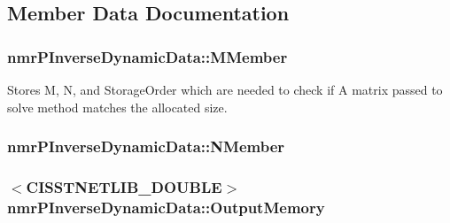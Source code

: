\subsection{Member Data Documentation}
\hypertarget{classnmr_p_inverse_dynamic_data_a747c7b9fb8208d7a1a1b780e5fb0fb55}{
\subsubsection[{M\-Member}]{ nmr\-P\-Inverse\-Dynamic\-Data\-::\-M\-Member\hspace{0.3cm}{\ttfamily [protected]}}}\label{classnmr_p_inverse_dynamic_data_a747c7b9fb8208d7a1a1b780e5fb0fb55}
Stores M, N, and Storage\-Order which are needed to check if A matrix passed to solve method matches the allocated size. \hypertarget{classnmr_p_inverse_dynamic_data_a1ba9d083e553858b17f7ec109261223e}{
\subsubsection[{N\-Member}]{ nmr\-P\-Inverse\-Dynamic\-Data\-::\-N\-Member\hspace{0.3cm}{\ttfamily [protected]}}}\label{classnmr_p_inverse_dynamic_data_a1ba9d083e553858b17f7ec109261223e}
\hypertarget{classnmr_p_inverse_dynamic_data_ac1c4149267a493ae2077a77ebe33224a}{
\subsubsection[{Output\-Memory}]{$<$C\-I\-S\-S\-T\-N\-E\-T\-L\-I\-B\-\_\-\-D\-O\-U\-B\-L\-E$>$ nmr\-P\-Inverse\-Dynamic\-Data\-::\-Output\-Memory\hspace{0.3cm}{\ttfamily [protected]}}}\label{classnmr_p_inverse_dynamic_data_ac1c4149267a493ae2077a77ebe33224a}
